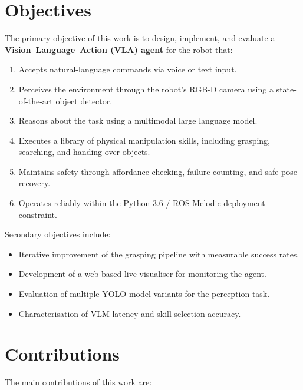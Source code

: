 \section{Objectives}

The primary objective of this work is to design, implement, and evaluate a
\textbf{Vision--Language--Action (VLA) agent} for the \tiago{} robot that:

\begin{enumerate}
  \item Accepts natural-language commands via voice or text input.
  \item Perceives the environment through the robot's RGB-D camera using a
        state-of-the-art object detector.
  \item Reasons about the task using a multimodal large language model.
  \item Executes a library of physical manipulation skills, including grasping,
        searching, and handing over objects.
  \item Maintains safety through affordance checking, failure counting, and safe-pose
        recovery.
  \item Operates reliably within the Python 3.6 / ROS Melodic deployment constraint.
\end{enumerate}

Secondary objectives include:

\begin{itemize}
  \item Iterative improvement of the grasping pipeline with measurable success rates.
  \item Development of a web-based live visualiser for monitoring the agent.
  \item Evaluation of multiple YOLO model variants for the perception task.
  \item Characterisation of VLM latency and skill selection accuracy.
\end{itemize}

\section{Contributions}

The main contributions of this work are:

